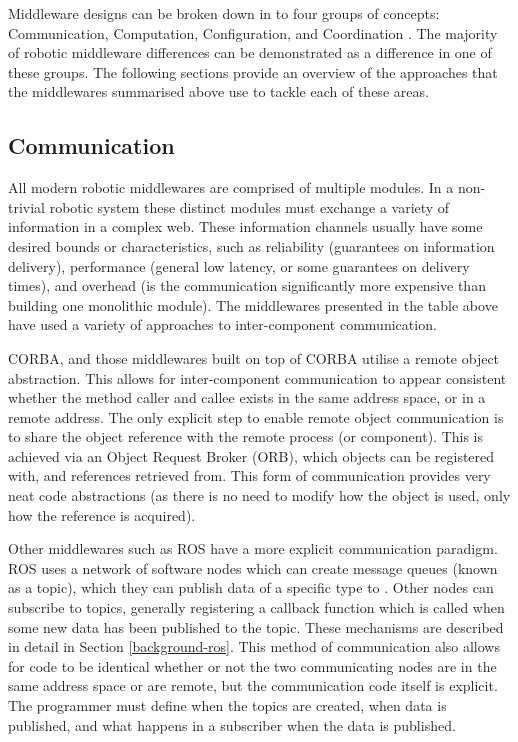 \documentclass[../dissertation.tex]{subfiles}
\begin{document}
Middleware designs can be broken down in to four groups of concepts: Communication, Computation, Configuration, and Coordination \cite{brugali2010component}. The majority of robotic middleware differences can be demonstrated as a difference in one of these groups. The following sections provide an overview of the approaches that the middlewares summarised above use to tackle each of these areas.

\subsection{Communication}

All modern robotic middlewares are comprised of multiple modules. In a non-trivial robotic system these distinct modules must exchange a variety of information in a complex web. These information channels usually have some desired bounds or characteristics, such as reliability (guarantees on information delivery), performance (general low latency, or some guarantees on delivery times), and overhead (is the communication significantly more expensive than building one monolithic module). The middlewares presented in the table above have used a variety of approaches to inter-component communication.

CORBA, and those middlewares built on top of CORBA utilise a remote object abstraction. This allows for inter-component communication to appear consistent whether the method caller and callee exists in the same address space, or in a remote address. The only explicit step to enable remote object communication is to share the object reference with the remote process (or component). This is achieved via an Object Request Broker (ORB), which objects can be registered with, and references retrieved from. This form of communication provides very neat code abstractions (as there is no need to modify how the object is used, only how the reference is acquired).

Other middlewares such as ROS have a more explicit communication paradigm. ROS uses a network of software nodes which can create message queues (known as a topic), which they can publish data of a specific type to \cite{rosconcepts}. Other nodes can subscribe to topics, generally registering a callback function which is called when some new data has been published to the topic. These mechanisms are described in detail in Section \ref{background-ros}. This method of communication also allows for code to be identical whether or not the two communicating nodes are in the same address space or are remote, but the communication code itself is explicit. The programmer must define when the topics are created, when data is published, and what happens in a subscriber when the data is published.
\end{document}
